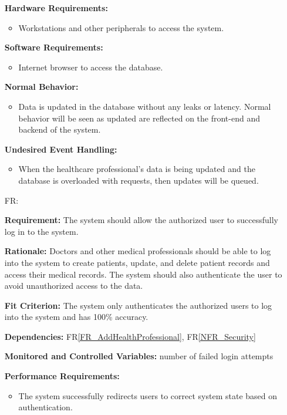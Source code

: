 \documentclass[12pt]{article}
\newcounter{reqnum} %
\begin{document}
\begin{itemize}
\textbf{Hardware Requirements:}
\begin{itemize}
  \item Workstations and other peripherals to access the system.
\end{itemize} 

\textbf{Software Requirements:}
\begin{itemize}
  \item Internet browser to access the database.
\end{itemize} 

\textbf{Normal Behavior:}
\begin{itemize}
  \item Data is updated in the database without any leaks or latency. Normal behavior will be seen as updated are reflected on the front-end and backend of the system.
\end{itemize} 

\textbf{Undesired Event Handling:}
\begin{itemize}
  \item When the healthcare professional's data is being updated and the database is overloaded with requests, then updates will be queued.
\end{itemize} 

\item[FR\refstepcounter{reqnum}\thereqnum \label{FR_login}:]

\textbf{Requirement:} The system should allow the authorized user to successfully log in to the system.

\textbf{Rationale:} Doctors and other medical professionals should be able to log into the system to create patients, update, and delete patient records and access their medical records. The system should also authenticate the user to avoid unauthorized access to the data.

\textbf{Fit Criterion:} The system only authenticates the authorized users to log into the system and has 100\% accuracy. 

\textbf{Dependencies:} FR\ref{FR_AddHealthProfessional}, FR\ref{NFR_Security}

\textbf{Monitored and Controlled Variables:} number of failed login attempts

\textbf{Performance Requirements:} 
\begin{itemize}
  \item The system successfully redirects users to correct system state based on authentication.
\end{itemize}


\end{itemize}
\end{document}
